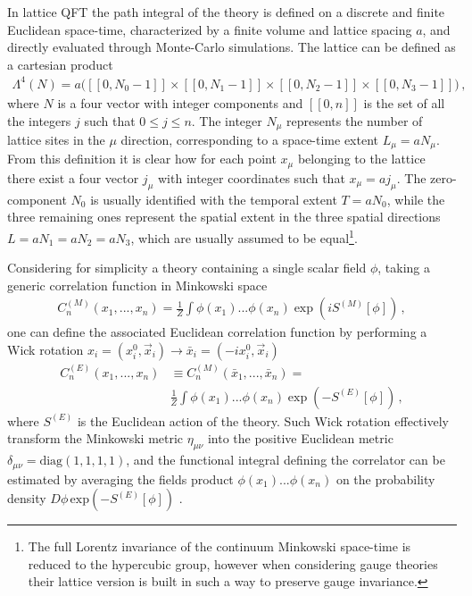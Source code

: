 %
In lattice QFT the path integral of the theory is defined on a discrete and finite Euclidean space-time,
characterized by a finite volume and lattice spacing $a$, and directly evaluated through Monte-Carlo simulations.
The lattice can be defined as a cartesian product
\begin{align}
    \label{eq:lattice_def}
    \Lambda^4\left(N\right) = a\Big([\![0, N_0-1 ]\!]\times[\![0, N_1-1 ]\!]\times[\![0, N_2-1 ]\!]
    \times[\![0, N_3-1 ]\!] \Big)\,,
\end{align}
where $N$ is a four vector with integer components and $[\![0, n ]\!]$ is the set of all the integers $j$ such that
$0 \le j \le n$. The integer $N_{\mu}$ represents the number of lattice sites in the $\mu$ direction, corresponding
to a space-time extent $L_{\mu}= a N_{\mu}$. 
From this definition it is clear how for each point $x_{\mu}$ belonging to the lattice there exist a four vector $j_{\mu}$ 
with integer coordinates such that $x_{\mu} = a j_{\mu}$. 
The zero-component $N_0$ is usually identified with the temporal extent
$T = a N_0$, while the three remaining ones represent the spatial extent in the three spatial directions
$L = a N_1 = a N_2 = a N_3$, which are usually assumed to be equal\footnote{The full Lorentz invariance of the continuum 
Minkowski space-time is reduced to the hypercubic group, 
however when considering gauge theories their lattice version is built in such a way to preserve gauge invariance.}. 

Considering for simplicity a theory containing a single scalar field $\phi$,
taking a generic correlation function in Minkowski space 
\begin{align}
    C_n^{(M)}\left(x_1,..., x_n\right) = 
    \frac{1}{Z} \int \phi\left(x_1\right)...\phi\left(x_n\right)\exp\left(i S^{(M)}\left[\phi\right]\right)\,,
\end{align}
one can define the associated Euclidean correlation function
by performing a Wick rotation $x_i = \left(x^0_i, \vec{x}_i\right) \rightarrow \bar{x}_i = \left(-i x^0_i, \vec{x}_i\right)$
\begin{align}
    C_n^{(E)}\left(x_1,..., x_n\right) &\equiv C_n^{(M)}\left(\bar{x}_1,..., \bar{x}_n\right) = \nonumber \\
    &\frac{1}{Z} \int \phi\left(x_1\right)...\phi\left(x_n\right)\exp\left(- S^{(E)}\left[\phi\right]\right)\,,
\end{align}
where $S^{(E)}$ is the Euclidean action of the theory.
Such Wick rotation effectively transform the Minkowski metric $\eta_{\mu\nu}$ into the positive Euclidean metric
$\delta_{\mu\nu} = \text{diag}\left(1,1,1,1\right)$, and the functional integral defining the correlator can be estimated
by averaging the fields product $\phi\left(x_1\right)...\phi\left(x_n\right)$ on the probability density 
$D\phi \, \text{exp}\left(-S^{(E)}\left[\phi\right]\right)$ .


